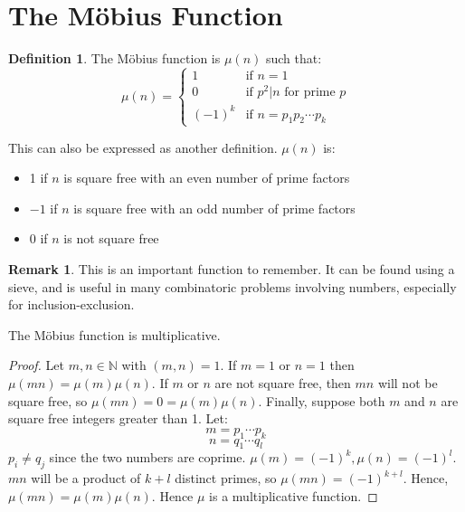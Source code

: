 \documentclass[12pt,letterpaper]{book}
\theoremstyle{definition}
\newtheorem{definition}{Definition} %
\newtheorem*{remark}{Remark}
\newcommand{\N}{\mathbb{N}}
\begin{document}
\section{The M\"{o}bius Function}

\begin{definition}
  The M\"{o}bius function is $\mu(n)$ such that:
  \[\mu(n) = \begin{cases}
    1 & \text{if } n = 1 \\
    0 & \text{if } p^2 |n \text{ for prime } p \\
    (-1)^k & \text{if } n = p_1p_2 \cdots p_k
  \end{cases}\]
\end{definition}

This can also be expressed as another definition. $\mu(n)$ is:
\begin{itemize}
  \item 1 if $n$ is square free with an even number of prime factors
  \item $-1$ if $n$ is square free with an odd number of prime factors
  \item 0 if $n$ is not square free
\end{itemize}

\begin{remark}
  This is an important function to remember. It can be found using a sieve, and is useful in many combinatoric problems involving numbers, especially for inclusion-exclusion.
\end{remark}

\begin{theorem}
  The M\"{o}bius function is multiplicative.
\end{theorem}
\begin{proof}
  Let $m,n \in \N$ with $(m,n) = 1$. If $m=1$ or $n=1$ then $\mu(mn) = \mu(m)\mu(n)$. If $m$ or $n$ are not square free, then $mn$ will not be square free, so $\mu(mn) = 0 = \mu(m)\mu(n)$. Finally, suppose both $m$ and $n$ are square free integers greater than 1. Let:
  \[m= p_1 \cdots p_k\]
  \[n = q_1 \cdots q_l\]
  $p_i \neq q_j$ since the two numbers are coprime. $\mu(m) = (-1)^k, \mu(n) = (-1)^l$. $mn$ will be a product of $k+l$ distinct primes, so $\mu(mn) = (-1)^{k+l}$. Hence, $\mu(mn) = \mu(m)\mu(n)$. Hence $\mu$ is a multiplicative function.
\end{proof}
\end{document}
